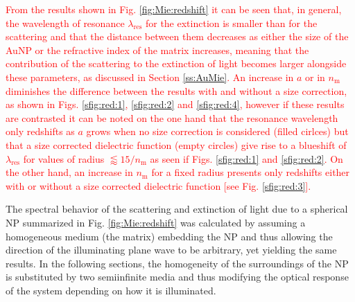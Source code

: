 \textcolor{red}{
From the results shown in Fig. \ref{fig:Mie:redshift} it can be seen that, in general, the wavelength of resonance  $\lambda_\text{res}$ for the extinction is smaller than for the scattering  and that the distance between them decreases as either the size of the AuNP or the refractive index of the matrix increases, meaning that the contribution of the scattering to the extinction of light becomes larger alongside these parameters, as discussed in Section \ref{ss:AuMie}. An increase in $a$ or in $n_\text{m}$ diminishes the difference between the results with and without a size correction, as shown in Figs. \ref{sfig:red:1}, \ref{sfig:red:2} and \ref{sfig:red:4},  however if these results are contrasted  it can be noted on the one hand that the resonance wavelength only redshifts as $a$ grows when no size correction is considered (filled cirlces) but that a size corrected dielectric function (empty circles) give rise to a blueshift of $\lambda_\text{res}$ for values of radius $\lessapprox 15/n_\text{m}$ as seen if Figs. \ref{sfig:red:1} and \ref{sfig:red:2}. On the other hand, an increase in $n_\text{m}$ for a fixed radius presents only redshifts either with or without a size corrected dielectric function [see Fig. \ref{sfig:red:3}].
}

The spectral behavior of the scattering and extinction of light due to a spherical NP summarized in Fig. \ref{fig:Mie:redshift} was calculated by assuming a homogeneous medium (the matrix) embedding the NP and thus allowing the direction of the illuminating plane wave to be arbitrary, yet yielding the same results. In the following sections, the homogeneity of the surroundings of the NP is substituted by two semiinfinite media and thus modifying the optical response of the system depending on how it is illuminated.
